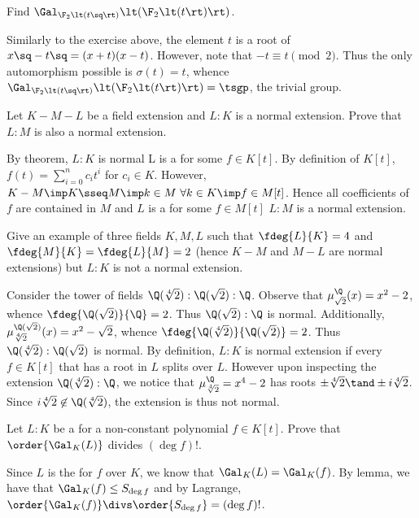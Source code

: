 \documentclass{article}
\begin{document}
\begin{subexercise}
  Find $ \Gal_{\F_2\lt(t\sq\rt)}\lt(\F_2\lt(t\rt)\rt) $.
\end{subexercise}
\begin{solution}
  Similarly to the exercise above, the element $ t $ is a root of $ x\sq-t\sq = (x+t)(x-t) $.
  However, note that $ -t \equiv t \pmod 2 $.
  Thus the only automorphism possible is $ \sigma(t) = t $, whence $ \Gal_{\F_2\lt(t\sq\rt)}\lt(\F_2\lt(t\rt)\rt) = \tsgp $, the trivial group.
\end{solution}

\begin{subexercise}
  Let $K - M - L$ be a field extension and $ L:K $ is a normal extension.
  Prove that $L:M$ is also a normal extension.
\end{subexercise}
\begin{solution}
By theorem, $ L:K $ is normal \iff L is a \sf for some $ f\in K[t] $.
By definition of $ K[t] $, $ f(t)=\sum\limits_{i=0}^n c_it^i $ for $ c_i\in K $.
However, $ K-M\imp K\sseq M \imp k\in M \ \forall k\in K \imp f\in M[t]$.
Hence all coefficients of $ f $ are contained in $ M $ and $ L $ is a \sf for some $ f\in M[t] $ \iff $ L:M $ is a normal extension.
\end{solution}

\begin{subexercise}
  Give an example of three fields $K, M, L$ such that $\fdeg{L}{K} = 4$ and $ \fdeg{M}{K} = \fdeg{L}{M} = 2 $ (hence $ K-M $ and $ M-L $ are normal extensions) but $L : K$ is not a normal extension.
\end{subexercise}
\begin{solution}
Consider the tower of fields $ \Q(\sqrt[4]2):\Q(\sqrt 2):\Q $.
Observe that $ \mu_{\sqrt 2}^\Q(x) = x^2-2 $, whence $ \fdeg{\Q(\sqrt 2)}{\Q} = 2 $.
Thus $ \Q(\sqrt 2):\Q $ is normal.
Additionally, $ \mu_{\sqrt[4] 2}^{\Q(\sqrt 2)}(x) = x^2-\sqrt 2 $, whence $ \fdeg{\Q(\sqrt[4] 2)}{\Q(\sqrt 2)} = 2 $.
Thus $ \Q(\sqrt[4] 2):\Q(\sqrt 2) $ is normal.
By definition, $ L:K $ is normal extension if every $ f\in K[t] $ that has a root in $ L $ splits over $ L $.
However upon inspecting the extension $ \Q(\sqrt[4]2):\Q $, we notice that $ \mu_{\sqrt[4]2}^\Q = x^4-2 $ has roots $ \pm\sqrt[4]2 \tand \pm i\sqrt[4]2 $.
Since $ i\sqrt[4]2 \not\in \Q(\sqrt[4]2) $, the extension is thus not normal.
\end{solution}

\begin{exercise}
  Let $ L:K $ be a \sfe for a non-constant polynomial $ f\in K[t] $.
  Prove that $ \order{\Gal_K(L)} $ divides $ (\deg f)! $.
\end{exercise}
\begin{solution}
  Since $ L $ is the \sfe for $ f $ over $ K $, we know that $ \Gal_K(L) = \Gal_K(f) $.
  By lemma, we have that $ \Gal_K(f)\leq S_{\deg f} $ and by Lagrange, $ \order{\Gal_K(f)} \divs \order{S_{\deg f}}=(\deg f)! $.
\end{solution}
\end{document}
